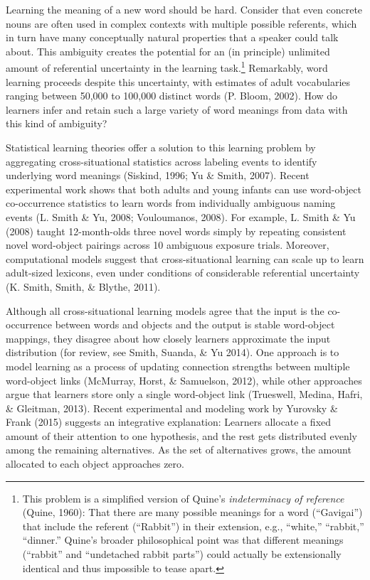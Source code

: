 \documentclass[authoryear, review]{elsarticle}
\begin{document}
Learning the meaning of a new word should be hard. Consider that even
concrete nouns are often used in complex contexts with multiple possible
referents, which in turn have many conceptually natural properties that
a speaker could talk about. This ambiguity creates the potential for an
(in principle) unlimited amount of referential uncertainty in the
learning task.\footnote{This problem is a simplified version of Quine's
  \textit{indeterminacy of reference} (Quine, 1960): That there are many
  possible meanings for a word (``Gavigai'') that include the referent
  (``Rabbit'') in their extension, e.g., ``white,'' ``rabbit,''
  ``dinner.'' Quine's broader philosophical point was that different
  meanings (``rabbit'' and ``undetached rabbit parts'') could actually
  be extensionally identical and thus impossible to tease apart.}
Remarkably, word learning proceeds despite this uncertainty, with
estimates of adult vocabularies ranging between 50,000 to 100,000
distinct words (P. Bloom, 2002). How do learners infer and retain such a
large variety of word meanings from data with this kind of ambiguity?

Statistical learning theories offer a solution to this learning problem
by aggregating cross-situational statistics across labeling events to
identify underlying word meanings (Siskind, 1996; Yu \& Smith, 2007).
Recent experimental work shows that both adults and young infants can
use word-object co-occurrence statistics to learn words from
individually ambiguous naming events (L. Smith \& Yu, 2008; Vouloumanos,
2008). For example, L. Smith \& Yu (2008) taught 12-month-olds three
novel words simply by repeating consistent novel word-object pairings
across 10 ambiguous exposure trials. Moreover, computational models
suggest that cross-situational learning can scale up to learn
adult-sized lexicons, even under conditions of considerable referential
uncertainty (K. Smith, Smith, \& Blythe, 2011).

Although all cross-situational learning models agree that the input is
the co-occurrence between words and objects and the output is stable
word-object mappings, they disagree about how closely learners
approximate the input distribution (for review, see Smith, Suanda, \& Yu
2014). One approach is to model learning as a process of updating
connection strengths between multiple word-object links (McMurray,
Horst, \& Samuelson, 2012), while other approaches argue that learners
store only a single word-object link (Trueswell, Medina, Hafri, \&
Gleitman, 2013). Recent experimental and modeling work by Yurovsky \&
Frank (2015) suggests an integrative explanation: Learners allocate a
fixed amount of their attention to one hypothesis, and the rest gets
distributed evenly among the remaining alternatives. As the set of
alternatives grows, the amount allocated to each object approaches zero.
\end{document}
